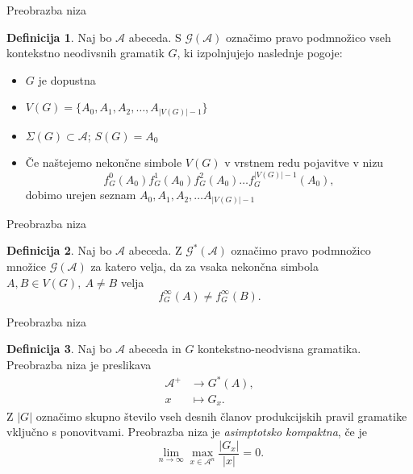 \documentclass{beamer}
\newcommand{\G}{\mathcal{G}}
\newcommand{\A}{\mathcal{A}}
\theoremstyle{definition} %
\newtheorem{definicija}{Definicija}[section]
\begin{document}
\begin{frame}{Preobrazba niza}
    \begin{definicija}
        Naj bo $\A$ abeceda. S $ \G(\A) $ označimo pravo podmnožico vseh kontekstno neodivsnih gramatik
        $G$, ki izpolnjujejo naslednje pogoje:
        \begin{itemize}
            \item<1-> $G$ je dopustna
            \item<2-> $ V(G) = \{ A_0, A_1, A_2, \ldots, A_{|V(G)| - 1} \} $
            \item<3-> $ \Sigma(G) \subset \A $; $ S(G) = A_0 $
            \item<4-> Če naštejemo nekončne simbole $V(G)$ v vrstnem redu pojavitve v nizu
            \[
            f_G^0(A_0) f_G^1(A_0) f_G^2(A_0) \dots f_G^{|V(G)| - 1}(A_0),
            \]
            dobimo urejen seznam $ A_0, A_1, A_2, \ldots A_{|V(G)| - 1} $
        \end{itemize}
    \end{definicija}
\end{frame}

\begin{frame}{Preobrazba niza}
    \begin{definicija}
        Naj bo $\A$ abeceda. Z $\G^*(\A)$ označimo pravo podmnožico množice $\G(\A)$ za katero velja, da za vsaka nekončna simbola $ A,B \in V(G), \ A \neq B $ velja
        \[
            f_G^\infty(A) \neq f_G^\infty(B).
        \]
    \end{definicija}
\end{frame}

\begin{frame}{Preobrazba niza}
    \begin{definicija}
        Naj bo $\A$ abeceda in $G$ kontekstno-neodvisna gramatika. 
        Preobrazba niza je preslikava
        \begin{align*}
            \A^+ &\rightarrow G^*(A), \\
            x &\mapsto G_x.
        \end{align*}
        \pause
        Z $|G|$ označimo skupno število vseh desnih članov produkcijskih pravil gramatike vključno s ponovitvami. Preobrazba niza je \textit{asimptotsko kompaktna}, če je
        \[
            \lim_{n \rightarrow \infty} \max_{x \in \A^n} \frac{|G_x|}{|x|} = 0.
        \]
    \end{definicija}
\end{frame}
\end{document}
